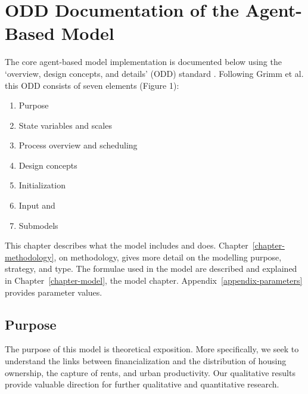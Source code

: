 \chapter{ODD Documentation of the Agent-Based Model} \label{appendix-odd}

The core agent-based model implementation is documented below using the `overview, design concepts, and details' (ODD) standard \cite{grimmODDProtocolReview2010a}. Following Grimm et al. \cite{grimmODDProtocolDescribing2020} this ODD consists of seven elements (Figure 1):

\begin{enumerate}
    \item Purpose
    \item State variables and scales
    \item Process overview and scheduling 
    \item Design concepts
    \item Initialization
    \item Input and 
    \item Submodels 
\end{enumerate}
This chapter describes what the model includes and does. Chapter~\ref{chapter-methodology}, on methodology, gives more detail on the modelling purpose, strategy, and type. The formulae used in the model are described and explained in Chapter~\ref{chapter-model}, the model chapter. Appendix~\ref{appendix-parameters} provides parameter values.  

\section{Purpose}
The purpose of this model is \gls{theoretical exposition}. More specifically, we seek to understand the links between financialization and  the distribution of housing ownership, the capture of rents, and  urban productivity. %
Our qualitative results provide valuable direction for further qualitative and quantitative research.




